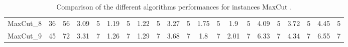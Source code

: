 \begin{sidewaystable}[!ht]
{\begin{tabular}{lcccccccccccccccccccc}
MaxCut\_8 & 36 & 56 & 3.09 & 5 &  \textcolor{blue2}{1.19} & 5 & 1.22 & 5 & 3.27 & 5 & 1.75 & 5 & 1.9 & 5 & 4.09 & 5 & 3.72 & 5 & 4.45 & 5 \\
MaxCut\_9 & 45 & 72 & 3.31 & 7 &  \textcolor{blue2}{1.26} & 7 & 1.29 & 7 & 3.68 & 7 & 1.8 & 7 & 2.01 & 7 & 6.33 & 7 & 4.34 & 7 & 6.55 & 7 \\
\bottomrule
\end{tabular}
}%
\caption{Comparison of the different algorithms performances for instances MaxCut .}
\label{tab:table_compare_MaxCut }
\end{sidewaystable}
